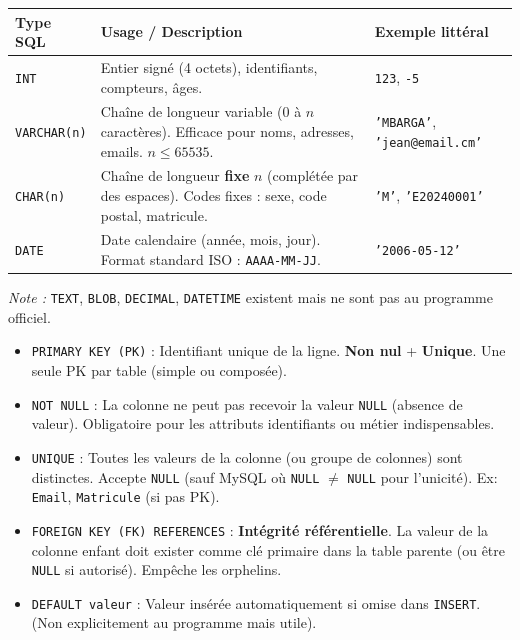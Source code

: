 \documentclass[11pt]{article}
\begin{document}
\begin{propriete}
\begin{center}
\begin{tabularx}{\linewidth}{|l|X|l|}
\hline
\textbf{Type SQL} & \textbf{Usage / Description} & \textbf{Exemple littéral} \\ \hline
\texttt{INT} & Entier signé (4 octets), identifiants, compteurs, âges. & \texttt{123}, \texttt{-5} \\ \hline
\texttt{VARCHAR(n)} & Chaîne de longueur variable ($0$ à $n$ caractères). Efficace pour noms, adresses, emails. $n \le 65535$. & \texttt{'MBARGA'}, \texttt{'jean@email.cm'} \\ \hline
\texttt{CHAR(n)} & Chaîne de longueur \textbf{fixe} $n$ (complétée par des espaces). Codes fixes : sexe, code postal, matricule. & \texttt{'M'}, \texttt{'E20240001'} \\ \hline
\texttt{DATE} & Date calendaire (année, mois, jour). Format standard ISO : \texttt{AAAA-MM-JJ}. & \texttt{'2006-05-12'} \\ \hline
\end{tabularx}
\end{center}
\emph{Note :} \texttt{TEXT}, \texttt{BLOB}, \texttt{DECIMAL}, \texttt{DATETIME} existent mais ne sont pas au programme officiel.
\end{propriete}

\begin{propriete}
\begin{itemize}
    \item \texttt{PRIMARY KEY (PK)} : Identifiant unique de la ligne. \textbf{Non nul} + \textbf{Unique}. Une seule PK par table (simple ou composée).
    \item \texttt{NOT NULL} : La colonne ne peut pas recevoir la valeur \texttt{NULL} (absence de valeur). Obligatoire pour les attributs identifiants ou métier indispensables.
    \item \texttt{UNIQUE} : Toutes les valeurs de la colonne (ou groupe de colonnes) sont distinctes. Accepte \texttt{NULL} (sauf MySQL où \texttt{NULL} $\neq$ \texttt{NULL} pour l'unicité). Ex: \texttt{Email}, \texttt{Matricule} (si pas PK).
    \item \texttt{FOREIGN KEY (FK) REFERENCES} : \textbf{Intégrité référentielle}. La valeur de la colonne enfant doit exister comme clé primaire dans la table parente (ou être \texttt{NULL} si autorisé). Empêche les orphelins.
    \item \texttt{DEFAULT valeur} : Valeur insérée automatiquement si omise dans \texttt{INSERT}. (Non explicitement au programme mais utile).
\end{itemize}
\end{propriete}
\end{document}
